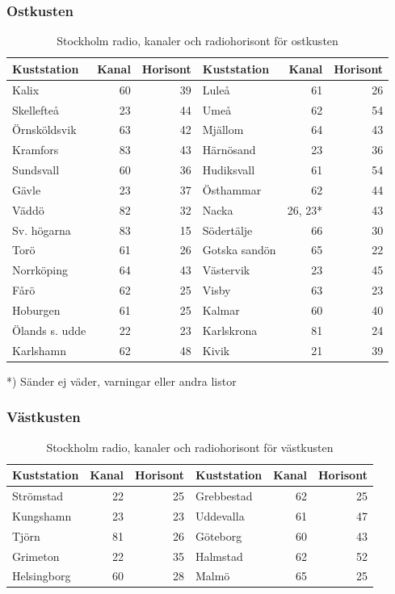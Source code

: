 \subsubsection{Ostkusten}

\begin{table}[H]
\centering
\begin{tabular}{lrr|lrr}
\textbf{Kuststation} & \textbf{Kanal} & \textbf{Horisont} & \textbf{Kuststation} & \textbf{Kanal}& \textbf{Horisont}\\
\hline
Kalix          & 60 & 39 & Luleå         & 61 & 26 \\
Skellefteå     & 23 & 44 & Umeå          & 62 & 54 \\
Örnsköldsvik   & 63 & 42 & Mjällom       & 64 & 43 \\
Kramfors       & 83 & 43 & Härnösand     & 23 & 36 \\
Sundsvall      & 60 & 36 & Hudiksvall    & 61 & 54 \\
Gävle          & 23 & 37 & Östhammar     & 62 & 44 \\
Väddö          & 82 & 32 & Nacka         & 26, 23* & 43 \\
Sv. högarna    & 83 & 15 & Södertälje    & 66 & 30 \\
Torö           & 61 & 26 & Gotska sandön & 65 & 22 \\
Norrköping     & 64 & 43 & Västervik     & 23 & 45 \\
Fårö           & 62 & 25 & Visby         & 63 & 23 \\
Hoburgen       & 61 & 25 & Kalmar        & 60 & 40 \\
Ölands s. udde & 22 & 23 & Karlskrona    & 81 & 24 \\
Karlshamn      & 62 & 48 & Kivik         & 21 & 39\\
\end{tabular}
\caption{Stockholm radio, kanaler och radiohorisont för ostkusten}
\end{table}

*) Sänder ej väder, varningar eller andra listor

\subsubsection{Västkusten}

\begin{table}[H]
\centering
\begin{tabular}{lrr|lrr}
\textbf{Kuststation} & \textbf{Kanal} & \textbf{Horisont} &
\textbf{Kuststation} & \textbf{Kanal} & \textbf{Horisont} \\
\hline
Strömstad   & 22 & 25 & Grebbestad & 62 & 25 \\
Kungshamn   & 23 & 23 & Uddevalla  & 61 & 47 \\
Tjörn       & 81 & 26 & Göteborg   & 60 & 43 \\
Grimeton    & 22 & 35 & Halmstad   & 62 & 52 \\
Helsingborg & 60 & 28 & Malmö      & 65 & 25 \\
\end{tabular}
\caption{Stockholm radio, kanaler och radiohorisont för västkusten}
\end{table}

